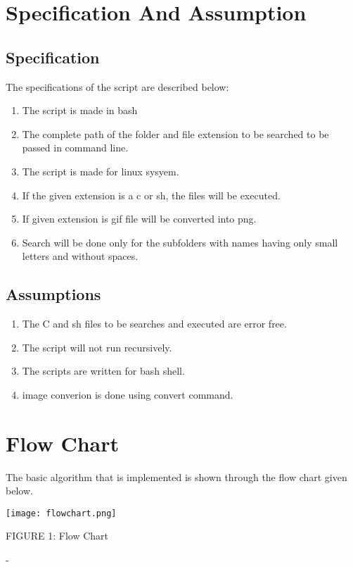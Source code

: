 \documentclass [12 pt ]{article}
\begin{document}
\newpage

\newpage
 \section{Specification And Assumption}
 \subsection{Specification}
 The specifications of the script are described below:
   \begin{enumerate}
  \item The script is made in bash 
  \item The complete path of the folder and file extension to be searched to be passed in command line.
  \item The script is made for linux sysyem.
  \item If the given extension is a c or sh, the files will be executed.
\item If given extension is gif file will be converted into png.
  \item Search will be done only for the subfolders with names having only small letters and without
spaces.


  

  \end{enumerate}
 \subsection{ Assumptions }
\begin{enumerate}
 \item The C and sh files to be searches and executed are error free.
 \item The script will not run recursively.
 \item The scripts are written for bash shell.
 \item image converion is done using convert command.
 \end{enumerate}

 \newpage
 
 \section{Flow Chart}
 The basic algorithm that is implemented is shown through the flow chart given below.

\begin{center}
\vspace{1cm}
\texttt{[image: flowchart.png]}

FIGURE 1: Flow Chart 
\end{center}-
\newpage
 
\end{document}
